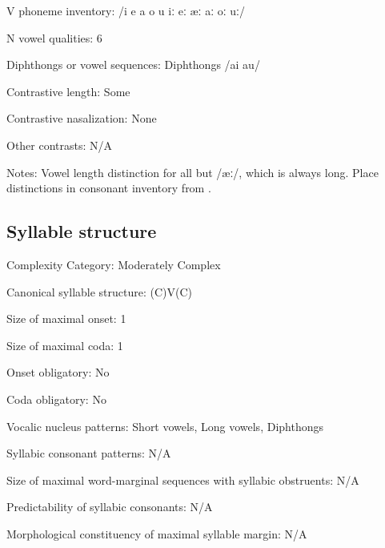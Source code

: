 {\begin{appendixdesc}
\item[V phoneme inventory:] /i e a o u iː eː æː aː oː uː/

\item[N vowel qualities:] 6

\item[Diphthongs or vowel sequences:] Diphthongs /ai au/

\item[Contrastive length:] Some

\item[Contrastive nasalization:] None

\item[Other contrasts:] N/A

\item[Notes:] Vowel length distinction for all but /æː/, which is always long. Place distinctions in consonant inventory from \citet[191]{KostićEtAl1977}.
\end{appendixdesc}
\subsection*{Syllable structure}
\begin{appendixdesc}

\item[Complexity Category:] Moderately Complex

\item[Canonical syllable structure:] (C)V(C) \citep[199]{KostićEtAl1977}

\item[Size of maximal onset:] 1

\item[Size of maximal coda:] 1

\item[Onset obligatory:] No

\item[Coda obligatory:] No

\item[Vocalic nucleus patterns:] Short vowels, Long vowels, Diphthongs

\item[Syllabic consonant patterns:] N/A

\item[Size of maximal word-marginal sequences with syllabic obstruents:] N/A

\item[Predictability of syllabic consonants:] N/A

\item[Morphological constituency of maximal syllable margin:] N/A


\end{appendixdesc}}
